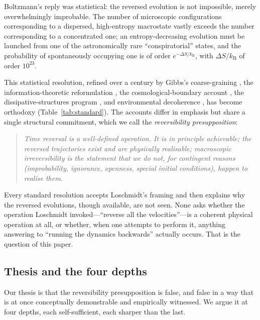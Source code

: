 \documentclass[11pt,a4paper]{article}
\theoremstyle{thmstyle}
\theoremstyle{definition}
\theoremstyle{remark}
\newcommand{\kB}{k_{\mathrm{B}}}
\begin{document}
Boltzmann's reply \citep{boltzmann1877} was statistical: the reversed
evolution is not impossible, merely overwhelmingly improbable. The
number of microscopic configurations corresponding to a dispersed,
high-entropy macrostate vastly exceeds the number corresponding to a
concentrated one; an entropy-decreasing evolution must be launched from
one of the astronomically rare ``conspiratorial'' states, and the
probability of spontaneously occupying one is of order
$e^{-\Delta S/\kB}$, with $\Delta S/\kB$ of order $10^{23}$.

This statistical resolution, refined over a century by Gibbs's
coarse-graining \citep{gibbs1902}, the information-theoretic
reformulation \citep{jaynes1957}, the cosmological-boundary account
\citep{penrose1989,penrose2004}, the dissipative-structures program
\citep{prigogine1980}, and environmental decoherence
\citep{zurek2003}, has become orthodoxy
(Table~\ref{tab:standard}). The accounts differ in emphasis but share a
single structural commitment, which we call the \emph{reversibility
presupposition}:

\begin{quote}
\emph{Time reversal is a well-defined operation. It is in principle
achievable; the reversed trajectories exist and are physically
realisable; macroscopic irreversibility is the statement that we do not,
for contingent reasons (improbability, ignorance, openness, special
initial conditions), happen to realise them.}
\end{quote}

Every standard resolution accepts Loschmidt's framing and then explains
why the reversed evolutions, though available, are not seen. None asks
whether the operation Loschmidt invoked---``reverse all the
velocities''---is a coherent physical operation at all, or whether, when
one attempts to perform it, anything answering to ``running the dynamics
backwards'' actually occurs. That is the question of this paper.

\subsection{Thesis and the four depths}
\label{sec:thesis}

Our thesis is that the reversibility presupposition is false, and false
in a way that is at once conceptually demonstrable and empirically
witnessed. We argue it at four depths, each self-sufficient, each
sharper than the last.
\end{document}
